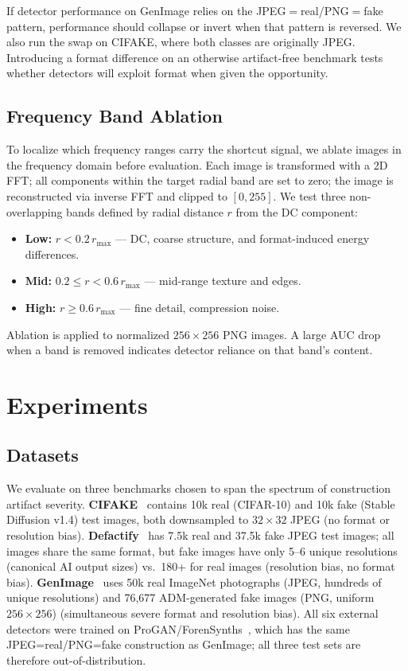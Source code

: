 \documentclass{article}
\begin{document}
If detector performance on GenImage relies on the JPEG$=$real/PNG$=$fake pattern, performance should collapse or invert when that pattern is reversed.
We also run the swap on CIFAKE, where both classes are originally JPEG.
Introducing a format difference on an otherwise artifact-free benchmark tests whether detectors will exploit format when given the opportunity.

\subsection{Frequency Band Ablation}

To localize which frequency ranges carry the shortcut signal, we ablate images in the frequency domain before evaluation.
Each image is transformed with a 2D FFT; all components within the target radial band are set to zero; the image is reconstructed via inverse FFT and clipped to $[0, 255]$.
We test three non-overlapping bands defined by radial distance $r$ from the DC component:
\begin{itemize}[itemsep=1pt,topsep=2pt]
  \item \textbf{Low:} $r < 0.2\,r_{\max}$ --- DC, coarse structure, and format-induced energy differences.
  \item \textbf{Mid:} $0.2 \leq r < 0.6\,r_{\max}$ --- mid-range texture and edges.
  \item \textbf{High:} $r \geq 0.6\,r_{\max}$ --- fine detail, compression noise.
\end{itemize}
Ablation is applied to normalized $256\times256$ PNG images.
A large AUC drop when a band is removed indicates detector reliance on that band's content.


\section{Experiments}
\label{sec:experiments}

\subsection{Datasets}

We evaluate on three benchmarks chosen to span the spectrum of construction artifact severity.
\textbf{CIFAKE}~\cite{cifake} contains 10k real (CIFAR-10) and 10k fake (Stable Diffusion v1.4) test images, both downsampled to $32\times32$ JPEG (no format or resolution bias).
\textbf{Defactify}~\cite{defactify} has 7.5k real and 37.5k fake JPEG test images; all images share the same format, but fake images have only 5--6 unique resolutions (canonical AI output sizes) vs.\ 180+ for real images (resolution bias, no format bias).
\textbf{GenImage}~\cite{genimage} uses 50k real ImageNet photographs (JPEG, hundreds of unique resolutions) and 76,677 ADM-generated fake images (PNG, uniform $256\times256$) (simultaneous severe format and resolution bias).
All six external detectors were trained on ProGAN/ForenSynths~\cite{wang2020cnn}, which has the same JPEG=real/PNG=fake construction as GenImage; all three test sets are therefore out-of-distribution.
\end{document}
